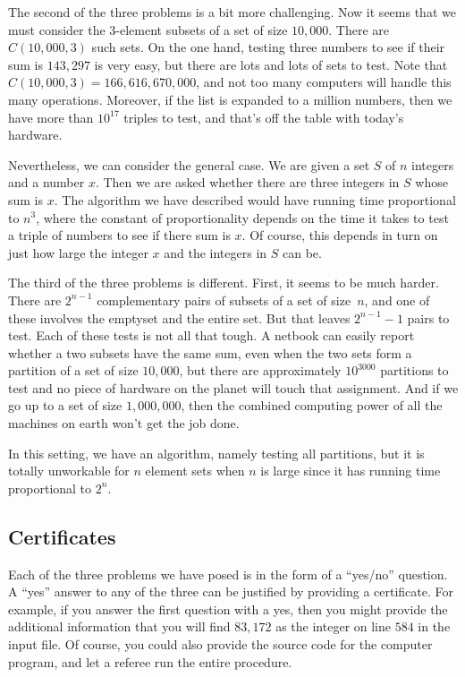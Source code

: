 The second of the three problems is a bit more challenging.  Now it seems
that we must consider the $3$-element subsets of a set of size $10,000$.
There are $C(10,000,3)$ such sets.  On the one hand, testing three
numbers to see if their sum is $143,297$ is very easy, but there are lots
and lots of sets to test.  Note that $C(10,000,3)=166,616,670,000$, and not
too many computers will handle this many operations.  Moreover, if the
list is expanded to a million numbers, then we have more than $10^{17}$
triples to test, and that's off the table with today's hardware.

Nevertheless, we can consider the general case.  We are given a set $S$ of $n$
integers and a number $x$.  Then we are asked whether there are
three integers in $S$ whose sum is $x$.  The algorithm we have
described would have running time proportional to $n^3$, where the constant
of proportionality depends on the time it takes to test a triple of
numbers to see if there sum is $x$.  Of course, this depends in turn
on just how large the integer $x$ and the integers in $S$ can be.

The third of the three problems is different. First, it seems to be much harder.
There are $2^{n-1}$ complementary pairs of subsets of a set of size~$n$,
and one of these involves the emptyset and the entire set.  But that
leaves $2^{n-1}-1$ pairs to test.  Each of these tests is not all that
tough.  A netbook can easily report whether a two subsets have the
same sum, even when the two sets form a partition of a set of size
$10,000$, but there are approximately $10^{3000}$ partitions to test
and no piece of hardware on the planet will touch that assignment.
And if we go up to a set of size $1,000,000$, then the combined computing
power of all the machines on earth won't get the job done.

In this setting, we have an algorithm, namely testing all partitions,
but it is totally unworkable for $n$ element sets when $n$ is large since 
it has running time proportional to $2^n$.

\subsection{Certificates}

Each of the three problems we have posed is in the form of a
``yes/no'' question. A ``yes'' answer to any of the three can be justified
by providing a certificate.  For example, if you answer the first
question with a yes, then you might provide the additional information
that you will find $83,172$ as the integer on line $584$ in the input
file.  Of course, you could also provide the source code for the
computer program, and let a referee run the entire procedure.


